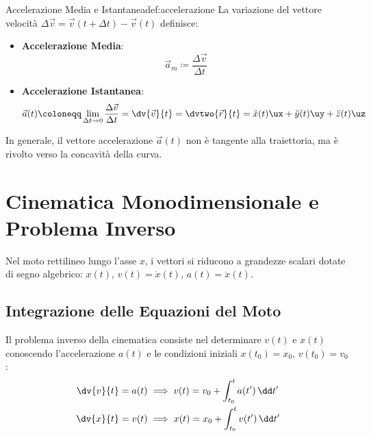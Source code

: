 \begin{definizione}{Accelerazione Media e Istantanea}{def:accelerazione}
La variazione del vettore velocità $\Delta\vec{v} = \vec{v}(t+\Delta t) - \vec{v}(t)$ definisce:
\begin{itemize}
    \item \textbf{Accelerazione Media}:
    \begin{equation}
        \vec{a}_m \coloneqq \frac{\Delta\vec{v}}{\Delta t}
    \end{equation}
    \item \textbf{Accelerazione Istantanea}:
    \begin{equation}
        \vec{a}(t) \coloneqq \lim_{\Delta t \to 0} \frac{\Delta\vec{v}}{\Delta t} = \dv{\vec{v}}{t} = \dvtwo{\vec{r}}{t} = \ddot{x}(t)\ux + \ddot{y}(t)\uy + \ddot{z}(t)\uz
        \label{eq:accelerazione_istantanea}
    \end{equation}
\end{itemize}
In generale, il vettore accelerazione $\vec{a}(t)$ non è tangente alla traiettoria, ma è rivolto verso la concavità della curva.
\end{definizione}

\section{Cinematica Monodimensionale e Problema Inverso}
\label{sec:moto_rettilineo}

Nel moto rettilineo lungo l'asse $x$, i vettori si riducono a grandezze scalari dotate di segno algebrico: $x(t)$, $v(t) = \dot{x}(t)$, $a(t) = \ddot{x}(t)$.

\subsection{Integrazione delle Equazioni del Moto}
Il problema inverso della cinematica consiste nel determinare $v(t)$ e $x(t)$ conoscendo l'accelerazione $a(t)$ e le condizioni iniziali $x(t_0) = x_0$, $v(t_0) = v_0$:
\begin{align}
    \dv{v}{t} = a(t) &\implies v(t) = v_0 + \int_{t_0}^t a(t')\,\dd t' \label{eq:int_v} \\
    \dv{x}{t} = v(t) &\implies x(t) = x_0 + \int_{t_0}^t v(t')\,\dd t' \label{eq:int_x}
\end{align}

